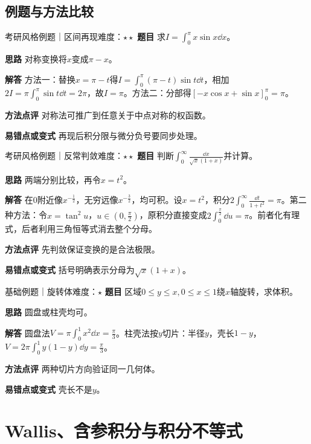 \subsection{例题与方法比较}
\begin{example}{考研风格例题｜区间再现}{难度：$\star\star$}
\label{ex:3:10}\textbf{题目} 求$I=\int_0^\pi x\sin x\dd x$。\par
\textbf{思路} 对称变换将$x$变成$\pi-x$。\par
\textbf{解答} 方法一：替换$x=\pi-t$得$I=\int_0^\pi(\pi-t)\sin t\dd t$，相加$2I=\pi\int_0^\pi\sin t\dd t=2\pi$，故$I=\pi$。方法二：分部得$[-x\cos x+\sin x]_0^\pi=\pi$。\par
\textbf{方法点评} 对称法可推广到任意关于中点对称的权函数。\par
\textbf{易错点或变式} 再现后积分限与微分负号要同步处理。
\end{example}
\begin{example}{考研风格例题｜反常判敛}{难度：$\star\star$}
\label{ex:3:11}\textbf{题目} 判断$\int_0^\infty\frac{\dd x}{\sqrt{x}(1+x)}$并计算。\par
\textbf{思路} 两端分别比较，再令$x=t^2$。\par
\textbf{解答} 在0附近像$x^{-\frac{1}{2}}$，无穷远像$x^{-\frac{3}{2}}$，均可积。设$x=t^2$，积分$2\int_0^\infty\frac{\dd t}{1+t^2}=\pi$。第二种方法：令$x=\tan^2u$，$u\in(0,\frac{\pi}{2})$，原积分直接变成$2\int_0^{\frac{\pi}{2}}\dd u=\pi$。前者化有理式，后者利用三角恒等式消去整个分母。\par
\textbf{方法点评} 先判敛保证变换的是合法极限。\par
\textbf{易错点或变式} 括号明确表示分母为$\sqrt x(1+x)$。
\end{example}
\begin{example}{基础例题｜旋转体}{难度：$\star$}
\label{ex:3:12}\textbf{题目} 区域$0\le y\le x,0\le x\le1$绕$x$轴旋转，求体积。\par
\textbf{思路} 圆盘或柱壳均可。\par
\textbf{解答} 圆盘法$V=\pi\int_0^1x^2\dd x=\frac{\pi}{3}$。柱壳法按$y$切片：半径$y$，壳长$1-y$，$V=2\pi\int_0^1y(1-y)\dd y=\frac{\pi}{3}$。\par
\textbf{方法点评} 两种切片方向验证同一几何体。\par
\textbf{易错点或变式} 壳长不是$y$。
\end{example}
\section{Wallis、含参积分与积分不等式}\label{sec:3:5}
